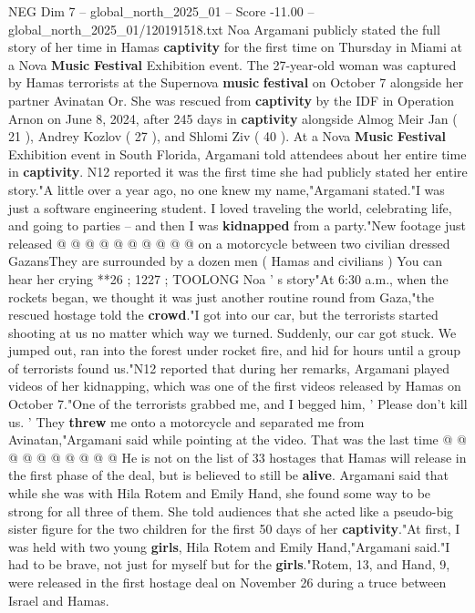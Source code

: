 \begin{textsample}{NEG Dim 7 – global\_north\_2025\_01 – Score -11.00 – global\_north\_2025\_01/120191518.txt}  \label{ex:f7_neg_054}
Noa Argamani publicly stated the full story of her time in Hamas \textbf{captivity} for the first time on Thursday in Miami at a Nova \textbf{Music} \textbf{Festival} Exhibition event.
The 27-year-old woman was captured by Hamas terrorists at the Supernova \textbf{music} \textbf{festival} on October 7 alongside her partner Avinatan Or.
She was rescued from \textbf{captivity} by the IDF in Operation Arnon on June 8, 2024, after 245 days in \textbf{captivity} alongside Almog Meir Jan ( 21 ), Andrey Kozlov ( 27 ), and Shlomi Ziv ( 40 ).
At a Nova \textbf{Music} \textbf{Festival} Exhibition event in South Florida, Argamani told attendees about her entire time in \textbf{captivity}.
N12 reported it was the first time she had publicly stated her entire story."A little over a year ago, no one knew my name,"Argamani stated."I was just a software engineering student.
I loved traveling the world, celebrating life, and going to parties -- and then I was \textbf{kidnapped} from a party."New footage just released @ @ @ @ @ @ @ @ @ @ on a motorcycle between two civilian dressed GazansThey are surrounded by a dozen men ( Hamas and civilians ) You can hear her crying **26 ; 1227 ; TOOLONG Noa ' s story"At 6:30 a.m., when the rockets began, we thought it was just another routine round from Gaza,"the rescued hostage told the \textbf{crowd}."I got into our car, but the terrorists started shooting at us no matter which way we turned.
Suddenly, our car got stuck.
We jumped out, ran into the forest under rocket fire, and hid for hours until a group of terrorists found us."N12 reported that during her remarks, Argamani played videos of her kidnapping, which was one of the first videos released by Hamas on October 7."One of the terrorists grabbed me, and I begged him, ' Please don't kill us. ' They \textbf{threw} me onto a motorcycle and separated me from Avinatan,"Argamani said while pointing at the video.
That was the last time @ @ @ @ @ @ @ @ @ @ He is not on the list of 33 hostages that Hamas will release in the first phase of the deal, but is believed to still be \textbf{alive}.
Argamani said that while she was with Hila Rotem and Emily Hand, she found some way to be strong for all three of them.
She told audiences that she acted like a pseudo-big sister figure for the two children for the first 50 days of her \textbf{captivity}."At first, I was held with two young \textbf{girls}, Hila Rotem and Emily Hand,"Argamani said."I had to be brave, not just for myself but for the \textbf{girls}."Rotem, 13, and Hand, 9, were released in the first hostage deal on November 26 during a truce between Israel and Hamas.

\end{textsample}
